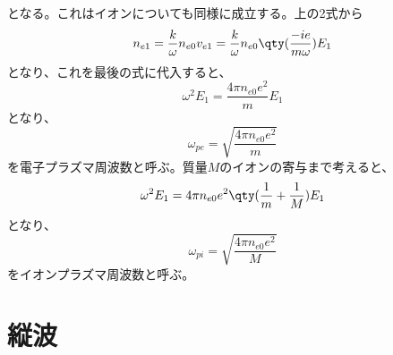 となる。これはイオンについても同様に成立する。上の2式から
\begin{equation}
	n_{e1} = \frac{k}{\omega}n_{e0}v_{e1} = \frac{k}{\omega}n_{e0}\qty(\frac{-ie}{m\omega})E_1
\end{equation}
となり、これを最後の式に代入すると、
\begin{equation}
	\omega^2 E_1 = \frac{4\pi{}n_{e0}e^2}{m}E_1
\end{equation}
となり、
\begin{equation}
	\omega_{pe} = \sqrt{\frac{4\pi{}n_{e0}e^2}{m}}
\end{equation}
を電子プラズマ周波数と呼ぶ。質量$M$のイオンの寄与まで考えると、
\begin{equation}
	\omega^2E_1 =  4\pi{}n_{e0}e^2\qty(\frac{1}{m} + \frac{1}{M})E_1
\end{equation}
となり、
\begin{equation}
	\omega_{pi} = \sqrt{\frac{4\pi{}n_{e0}e^2}{M}}
\end{equation}
をイオンプラズマ周波数と呼ぶ。

\section{縦波}
